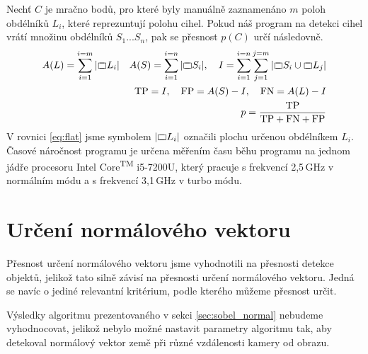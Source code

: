 \documentclass[twoside]{ctuthesis}
\newcommand{\rectangle}{{%
  \ooalign{$\sqsubset\mkern3mu$\cr$\mkern3mu\sqsupset$\cr}%
}}
\begin{document}
Nechť $C$ je mračno bodů, pro které byly manuálně zaznamenáno 
$m$ poloh  obdélníků $L_i$, které reprezuntují polohu cihel. Pokud náš program na detekci cihel vrátí množinu obdélníků $S_1 ... S_n$, pak se přesnost $p(C)$ určí následovně.
\begin{align}
    A(L) = \sum_{i=1}^{i = m}|\rectangle L_i| \quad A(S) = \sum_{i=1}^{i = n}|\rectangle S_i|, \quad I = \sum_{i = 1}^{i = n} \sum_{j = 1}^{j=m} | \rectangle S_i \cup \rectangle L_j | \label{eq:flat} \\
    \text{TP} = I, \quad \text{FP} = A(S) - I, \quad \text{FN} = A(L) - I \\
    p = \frac{\text{TP}}{\text{TP} + \text{FN} + \text{FP}} \label{eq:accuracy}
\end{align}
V rovnici \ref{eq:flat} jsme symbolem $|\rectangle L_i|$ označili plochu určenou obdélníkem $L_i$.  
Časové náročnost programu je určena měřením času běhu programu na jednom jádře procesoru Intel\textregistered{} Core\textsuperscript{TM} i5-7200U, který pracuje s frekvencí 2,5$\,$GHz v normálním módu a s frekvencí 3,1$\,$GHz v turbo módu.

\section{Určení normálového vektoru}
\label{sec:res_normal}
Přesnost určení normálového vektoru jsme vyhodnotili na přesnosti detekce objektů, jelikož tato silně závisí na přesnosti určení normálového vektoru. Jedná se navíc o jediné relevantní kritérium, podle kterého můžeme přesnost určit.

Výsledky algoritmu prezentovaného v sekci \ref{sec:sobel_normal} nebudeme vyhodnocovat, jelikož nebylo možné nastavit parametry algoritmu tak, aby detekoval normálový vektor země při různé vzdálenosti kamery od obrazu.
\end{document}
